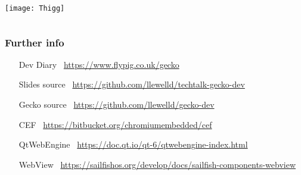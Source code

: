 \documentclass[
	notes=none,
	aspectratio=169
]{beamer}
\begin{document}

\begin{frame}

\begin{columns}[T]
\begin{column}[T]{1.0\textwidth}

\vspace{-0.12cm}
\hspace*{-1.1cm}
\texttt{[image: Thigg]}

\end{column}
\end{columns}

\end{frame}


\begin{frame}[fragile]
\frametitle{Further info}
\setlength{\leftmargini}{7.5em}
\vspace{1.0cm}

\begin{itemize}
\setlength{\parskip}{1.0em}
\item[Dev Diary \,] \url{https://www.flypig.co.uk/gecko}
\item[Slides source \,] \url{https://github.com/llewelld/techtalk-gecko-dev}
\item[Gecko source \,] \url{https://github.com/llewelld/gecko-dev}
\item[CEF \,] \url{https://bitbucket.org/chromiumembedded/cef}
\item[QtWebEngine \,] \url{https://doc.qt.io/qt-6/qtwebengine-index.html}
\item[WebView \,] \url{https://sailfishos.org/develop/docs/sailfish-components-webview}
\end{itemize}

\end{frame}
\note{
\fontsize{7pt}{8pt}{}

}

\end{document}
